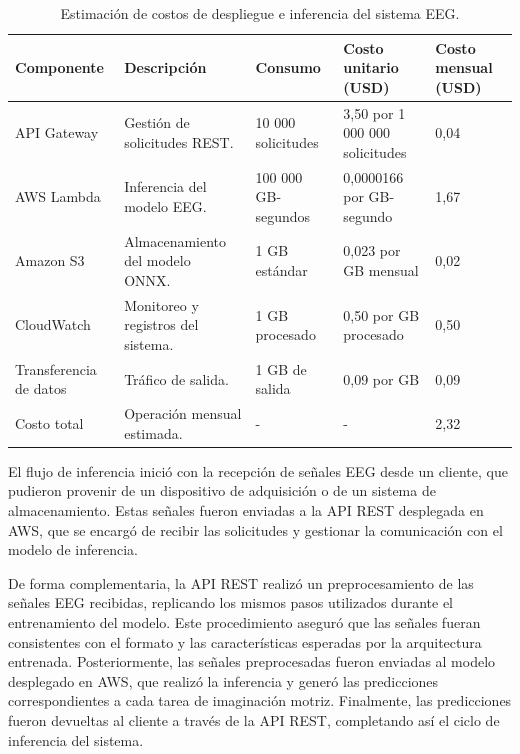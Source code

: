 \begin{table}[H]
\centering
\renewcommand{\arraystretch}{1.5}

\caption{Estimación de costos de despliegue e inferencia del sistema EEG.}
\label{tab:costos_despliegue}
\begin{tabular}{p{2cm}p{3cm}p{2.5cm}p{2.1cm}p{2cm}}
\toprule
\textbf{Componente} &
\textbf{Descripción} &
\textbf{Consumo} &
\textbf{Costo unitario (USD)} &
\textbf{Costo mensual (USD)} \\
\midrule
API Gateway &
Gestión de solicitudes REST. &
10 000 solicitudes &
3,50 por 1 000 000 solicitudes &
0,04 \\ 

AWS Lambda &
Inferencia del modelo EEG. &
100 000 GB-segundos &
0,0000166 por GB-segundo &
1,67 \\ 

Amazon S3 &
Almacenamiento del modelo ONNX. &
1 GB estándar &
0,023 por GB mensual &
0,02 \\ 

CloudWatch &
Monitoreo y registros del sistema. &
1 GB procesado &
0,50 por GB procesado &
0,50 \\ 

Transferencia de datos &
Tráfico de salida. &
1 GB de salida &
0,09 por GB &
0,09 \\ 

Costo total &
Operación mensual estimada. &
- &
- &
2,32 \\ 

\end{tabular}
\end{table}

El flujo de inferencia inició con la recepción de señales EEG desde un cliente, que pudieron provenir de un dispositivo de adquisición o de un sistema de almacenamiento. Estas señales fueron enviadas a la API REST desplegada en AWS, que se encargó de recibir las solicitudes y gestionar la comunicación con el modelo de inferencia.

De forma complementaria, la API REST realizó un preprocesamiento de las señales EEG recibidas, replicando los mismos pasos utilizados durante el entrenamiento del modelo. Este procedimiento aseguró que las señales fueran consistentes con el formato y las características esperadas por la arquitectura entrenada. Posteriormente, las señales preprocesadas fueron enviadas al modelo desplegado en AWS, que realizó la inferencia y generó las predicciones correspondientes a cada tarea de imaginación motriz. Finalmente, las predicciones fueron devueltas al cliente a través de la API REST, completando así el ciclo de inferencia del sistema.

